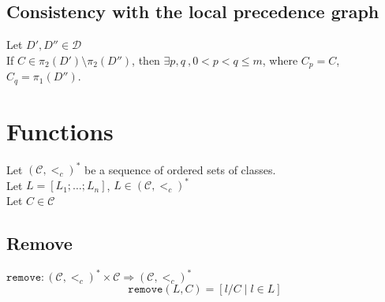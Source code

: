 \documentclass{article}
\newcommand*{\CC}{\ensuremath{\mathcal{C}}\xspace}
\newcommand*{\DD}{\ensuremath{\mathcal{D}}\xspace}
\newcommand*{\ordCC}{\ensuremath{(\mathcal{C}, <_c)}\xspace}
\newcommand*{\chrs}{\texttt{chars}}
\newcommand*{\mro}{\texttt{MRO}}
\newcommand*{\rem}{\texttt{remove}}
\begin{document}
%

\subsection*{Consistency with the local precedence graph}

Let $D', D'' \in \DD$ \\
If $C \in \pi_2(D') \setminus \pi_2(D'')$, then $\exists p,q \ ,0 < p < q \leq m$, where $C_p = C$, $C_q = \pi_1(D'')$.
\vspace{2cm}

\section*{Functions}

Let $\ordCC^*$ be a sequence of ordered sets of classes.\\
Let $L = [L_1; \ldots ; L_n]$, $L \in \ordCC^*$\\
Let $C \in \mathcal{C}$\\


\subsection*{Remove}

$\rem : \ordCC^* \times \CC \Rightarrow \ordCC^*$\\

\[
\rem(L, C) = [l/C \mid l \in L]
\]
\end{document}
